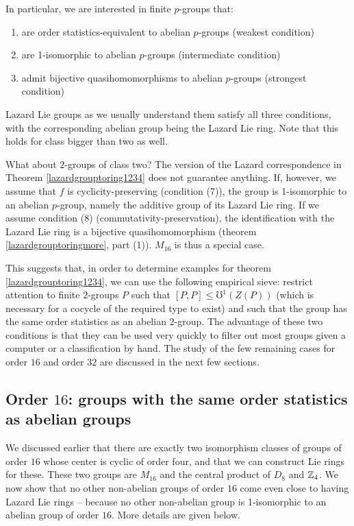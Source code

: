 \documentclass[10pt]{amsart}
\begin{document}
In particular, we are interested in finite $p$-groups that:

\begin{enumerate}
\item are order statistics-equivalent to abelian $p$-groups (weakest
  condition)
\item are 1-isomorphic to abelian $p$-groups (intermediate condition)
\item admit bijective quasihomomorphisms to abelian $p$-groups
  (strongest condition)
\end{enumerate}

Lazard Lie groups as we usually understand them satisfy all three
conditions, with the corresponding abelian group being the Lazard Lie
ring. Note that this holds for class bigger than two as well.

What about $2$-groups of class two? The version of the Lazard
correspondence in Theorem \ref{lazardgrouptoring1234} does not
guarantee anything. If, however, we assume that $f$ is
cyclicity-preserving (condition (7)), the group is 1-isomorphic to an
abelian $p$-group, namely the additive group of its Lazard Lie
ring. If we assume condition (8)
(commutativity-preservation), the identification with the Lazard Lie
ring is a bijective quasihomomorphism (theorem
\ref{lazardgrouptoringmore}, part (1)). $M_{16}$ is thus a special
case.

This suggests that, in order to determine examples for theorem
\ref{lazardgrouptoring1234}, we can use the following empirical sieve:
restrict attention to finite $2$-groups $P$ such that $[P,P] \le
\mho^1(Z(P))$ (which is necessary for a cocycle of the required type
to exist) and such that the group has the same order statistics as an
abelian $2$-group. The advantage of these two conditions is that they
can be used very quickly to filter out most groups given a computer or
a classification by hand. The study of the few remaining cases for
order $16$ and order $32$ are discussed in the next few sections.


\subsection{Order $16$: groups with the same order statistics as abelian groups}

We discussed earlier that there are exactly two isomorphism classes of
groups of order $16$ whose center is cyclic of order four, and that we
can construct Lie rings for these. These two groups are $M_{16}$ and
the central product of $D_8$ and $\mathbb{Z}_4$. We now show that no other
non-abelian groups of order $16$ come even close to having Lazard Lie
rings -- because no other non-abelian group is 1-isomorphic to an
abelian group of order $16$. More details are given below.
\end{document}
